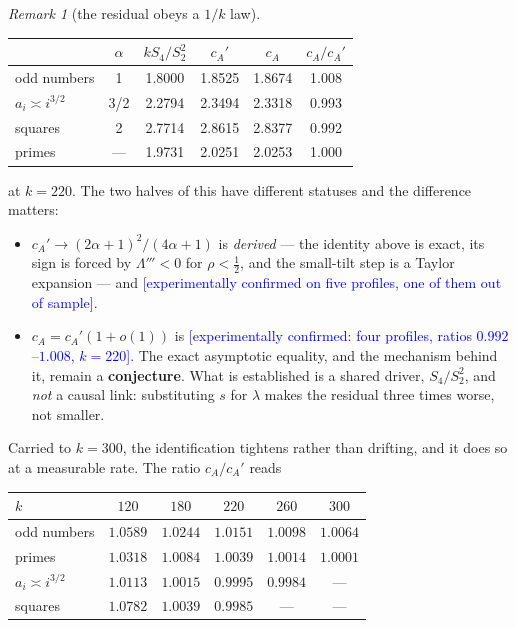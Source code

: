 \documentclass[11pt,a4paper]{article}
\theoremstyle{plain}
\theoremstyle{definition}
\theoremstyle{remark}
\newtheorem{remark}[theorem]{Remark}
\newcommand{\STATUS}[1]{\textcolor{blue}{\textsf{[#1]}}}
\begin{document}
\begin{remark}[the residual obeys a $1/k$ law]
\begin{center}
\begin{tabular}{lccccc}
\toprule
 & $\alpha$ & $kS_4/S_2^2$ & $c_A'$ & $c_A$ & $c_A/c_A'$\\
\midrule
odd numbers & 1 & 1.8000 & 1.8525 & 1.8674 & 1.008\\
$a_i\asymp i^{3/2}$ & 3/2 & 2.2794 & 2.3494 & 2.3318 & 0.993\\
squares & 2 & 2.7714 & 2.8615 & 2.8377 & 0.992\\
primes & --- & 1.9731 & 2.0251 & 2.0253 & 1.000\\
\bottomrule
\end{tabular}
\end{center}

\noindent
at $k=220$. The two halves of this have different statuses and the difference matters:

\begin{itemize}
\item $c_A'\to(2\alpha+1)^{2}/(4\alpha+1)$ is \emph{derived} --- the identity above is exact,
      its sign is forced by $\Lambda'''<0$ for $\rho<\tfrac12$, and the small-tilt step is a
      Taylor expansion --- and \STATUS{experimentally confirmed on five profiles, one of them
      out of sample}.
\item $c_A=c_A'(1+o(1))$ is \STATUS{experimentally confirmed: four profiles, ratios
      $0.992$--$1.008$, $k=220$}. The exact asymptotic equality, and the mechanism behind it,
      remain a \textbf{conjecture}. What is established is a shared driver, $S_4/S_2^{2}$, and
      \emph{not} a causal link: substituting $s$ for $\lambda$ makes the residual three times
      worse, not smaller.
\end{itemize}

\noindent
Carried to $k=300$, the identification tightens rather than drifting, and it does so at a
measurable rate. The ratio $c_A/c_A'$ reads

\begin{center}
\begin{tabular}{lccccc}
\toprule
$k$ & $120$ & $180$ & $220$ & $260$ & $300$\\
\midrule
odd numbers & $1.0589$ & $1.0244$ & $1.0151$ & $1.0098$ & $1.0064$\\
primes      & $1.0318$ & $1.0084$ & $1.0039$ & $1.0014$ & $1.0001$\\
$a_i\asymp i^{3/2}$ & $1.0113$ & $1.0015$ & $0.9995$ & $0.9984$ & ---\\
squares     & $1.0782$ & $1.0039$ & $0.9985$ & --- & ---\\
\bottomrule
\end{tabular}
\end{center}


\end{remark}
\end{document}
